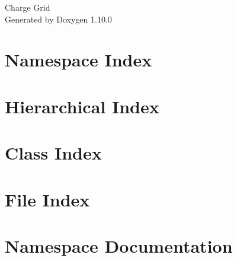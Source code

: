 \documentclass[twoside]{book}
\newcommand{\+}{\discretionary{\mbox{\scriptsize$\hookleftarrow$}}{}{}}
\newcommand{\clearemptydoublepage}{%
    \newpage{\pagestyle{empty}\cleardoublepage}%
  }
\begin{document}
  \raggedbottom
    \hypersetup{pageanchor=false,
                bookmarksnumbered=true,
                pdfencoding=unicode
               }
  \begin{titlepage}
  \vspace*{7cm}
  \begin{center}%
  {\Large Charge Grid}\\
  \vspace*{1cm}
  {\large Generated by Doxygen 1.10.0}\\
  \end{center}
  \end{titlepage}
  \clearemptydoublepage
  \tableofcontents
  \clearemptydoublepage
  \hypersetup{pageanchor=true}
\chapter{Namespace Index}

\chapter{Hierarchical Index}

\chapter{Class Index}

\chapter{File Index}

\chapter{Namespace Documentation}















\end{document}
